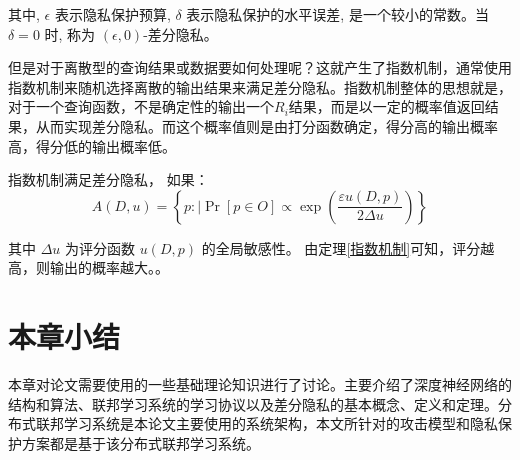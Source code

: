 其中, $\epsilon$ 表示隐私保护预算, $\delta$ 表示隐私保护的水平误差, 是一个较小的常数。当 $\delta=0$ 时, 称为 $(\epsilon, 0)$-差分隐私。

但是对于离散型的查询结果或数据要如何处理呢？这就产生了指数机制，通常使用指数机制来随机选择离散的输出结果来满足差分隐私。指数机制整体的思想就是，对于一个查询函数，不是确定性的输出一个$R_{i}$结果，而是以一定的概率值返回结果，从而实现差分隐私。而这个概率值则是由打分函数确定，得分高的输出概率高，得分低的输出概率低。

\begin{theorem}[指数机制]\label{指数机制}
指数机制满足差分隐私， 如果：
$$
A(D,u)=\left\{p: \mid \operatorname{Pr}[p \in O] \propto \exp \left(\frac{\varepsilon u(D,p)}{2 \Delta u}\right)\right\}
$$
\end{theorem}
其中 $\Delta u$ 为评分函数 $u(D,p)$ 的全局敏感性。 由定理\ref{指数机制}可知，评分越高，则输出的概率越大。。

\section{本章小结}
本章对论文需要使用的一些基础理论知识进行了讨论。主要介绍了深度神经网络的结构和算法、联邦学习系统的学习协议以及差分隐私的基本概念、定义和定理。分布式联邦学习系统是本论文主要使用的系统架构，本文所针对的攻击模型和隐私保护方案都是基于该分布式联邦学习系统。
